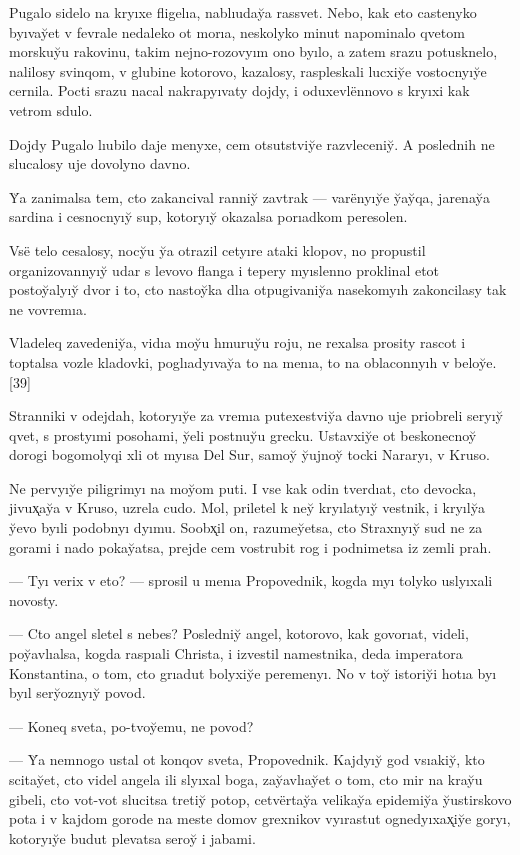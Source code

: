\documentclass[10pt]{book}
\begin{document}
Pugalo sidelo na kryıxe fligelıa, nablıuday̆a rassvet. Nebo, kak eto castenyko byıvay̆et v fevrale nedaleko ot morıa, neskolyko minut napominalo qvetom morskuy̆u rakovinu, takim nejno-rozovyım ono byılo, a zatem srazu potusknelo, nalilosy svinqom, v glubine kotorovo, kazalosy, raspleskali lucxiy̆e vostocnyıy̆e cernila. Pocti srazu nacal nakrapyıvaty dojdy, i oduxevlënnovo s kryıxi kak vetrom sdulo.

Dojdy Pugalo lıubilo daje menyxe, cem otsutstviy̆e razvleceniy̆. A poslednih ne slucalosy uje dovolyno davno.

Y̆a zanimalsa tem, cto zakancival ranniy̆ zavtrak — varënyıy̆e y̆ay̆qa, jarenay̆a sardina i cesnocnyıy̆ sup, kotoryıy̆ okazalsa porıadkom peresolen.

Vsë telo cesalosy, nocy̆u y̆a otrazil cetyıre ataki klopov, no propustil organizovannyıy̆ udar s levovo flanga i tepery myıslenno proklinal etot postoy̆alyıy̆ dvor i to, cto nastoy̆ka dlıa otpugivaniy̆a nasekomyıh zakoncilasy tak ne vovremıa.

Vladeleq zavedeniy̆a, vidıa moy̆u hmuruy̆u roju, ne rexalsa prosity rascot i toptalsa vozle kladovki, poglıadyıvay̆a to na menıa, to na oblaconnyıh v beloy̆e.[39]

Stranniki v odejdah, kotoryıy̆e za vremıa putexestviy̆a davno uje priobreli seryıy̆ qvet, s prostyımi posohami, y̆eli postnuy̆u grecku. Ustavxiy̆e ot beskonecnoy̆ dorogi bogomolyqi xli ot myısa Del Sur, samoy̆ y̆ujnoy̆ tocki Nararyı, v Kruso.

Ne pervyıy̆e piligrimyı na moy̆om puti. I vse kak odin tverdıat, cto devocka, jivux̨ay̆a v Kruso, uzrela cudo. Mol, priletel k ney̆ kryılatyıy̆ vestnik, i kryıly̆a y̆evo byıli podobnyı dyımu. Soobx̨il on, razumey̆etsa, cto Straxnyıy̆ sud ne za gorami i nado pokay̆atsa, prejde cem vostrubit rog i podnimetsa iz zemli prah.

— Tyı verix v eto? — sprosil u menıa Propovednik, kogda myı tolyko uslyıxali novosty.

— Cto angel sletel s nebes? Posledniy̆ angel, kotorovo, kak govorıat, videli, poy̆avlıalsa, kogda raspıali Christa, i izvestil namestnika, deda imperatora Konstantina, o tom, cto grıadut bolyxiy̆e peremenyı. No v toy̆ istoriy̆i hotıa byı byıl sery̆oznyıy̆ povod.

— Koneq sveta, po-tvoy̆emu, ne povod?

— Y̆a nemnogo ustal ot konqov sveta, Propovednik. Kajdyıy̆ god vsıakiy̆, kto scitay̆et, cto videl angela ili slyıxal boga, zay̆avlıay̆et o tom, cto mir na kray̆u gibeli, cto vot-vot slucitsa tretiy̆ potop, cetvërtay̆a velikay̆a epidemiy̆a y̆ustirskovo pota i v kajdom gorode na meste domov grexnikov vyırastut ognedyıxax̨iy̆e goryı, kotoryıy̆e budut plevatsa seroy̆ i jabami.
\end{document}
